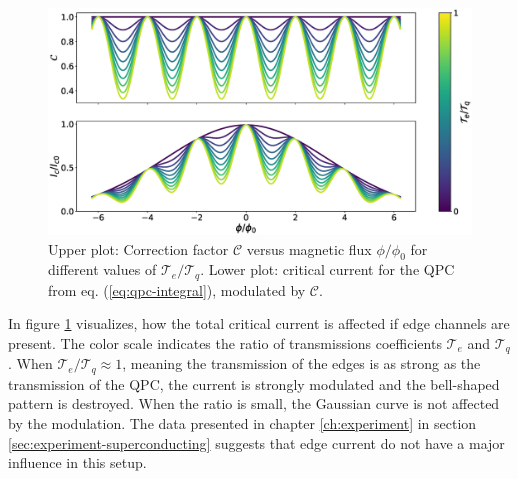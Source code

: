 \begin{figure}
\centering
\includegraphics[width=\textwidth]{figure/analyticalmodel/edge-current-modulation}
\caption{Upper plot: Correction factor $\mathcal{C}$ versus magnetic flux $\phi / \phi_0$ for different values of $\mathcal{T}_e / \mathcal{T}_q$. Lower plot: critical current for the QPC from eq. (\ref{eq:qpc-integral}), modulated by $\mathcal{C}$.}\label{fig:edge-current-modulation}
\end{figure}

In figure \ref{fig:edge-current-modulation} visualizes, how the total critical current is affected if edge channels are present. The color scale indicates the ratio of transmissions coefficients $\mathcal{T}_e$ and $\mathcal{T}_q$. When $\mathcal{T}_e / \mathcal{T}_q \approx 1$, meaning the transmission of the edges is as strong as the transmission of the QPC, the current is strongly modulated and the bell-shaped pattern is destroyed. When the ratio is small, the Gaussian curve is not affected by the modulation.
The data presented in chapter \ref{ch:experiment} in section \ref{sec:experiment-superconducting} suggests that edge current do not have a major influence in this setup. 

